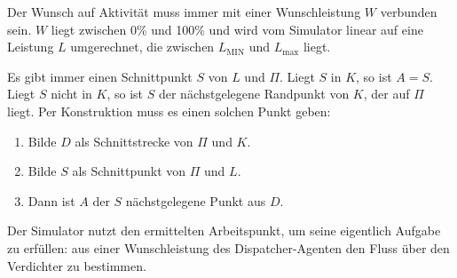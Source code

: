 \documentclass{article}
\newcommand{\LMIN}{L_\text{MIN}}
\newcommand{\Lmax}{L_\text{max}}
\begin{document}
Der Wunsch auf Aktivität muss immer mit einer Wunschleistung $W$ verbunden
sein. $W$ liegt zwischen 0\% und 100\% und wird vom Simulator linear auf eine
Leistung $L$ umgerechnet, die zwischen $\LMIN$ und $\Lmax$ liegt.

Es gibt immer einen Schnittpunkt $S$ von $L$ und $\Pi$. Liegt $S$ in $K$, so ist $A = S$. Liegt $S$ nicht in $K$, so ist $S$ der nächstgelegene Randpunkt von $K$, der auf
$\Pi$ liegt. Per Konstruktion muss es einen solchen Punkt geben:

\begin{enumerate}
\item Bilde $D$ als Schnittstrecke von $\Pi$ und $K$.
\item Bilde $S$ als Schnittpunkt von $\Pi$ und $L$.
\item Dann ist $A$ der $S$ nächstgelegene Punkt aus $D$.

\end{enumerate}

Der Simulator nutzt den ermittelten Arbeitspunkt, um seine eigentlich Aufgabe zu erfüllen: aus einer Wunschleistung des Dispatcher-Agenten den Fluss über den Verdichter zu bestimmen. 
\end{document}

